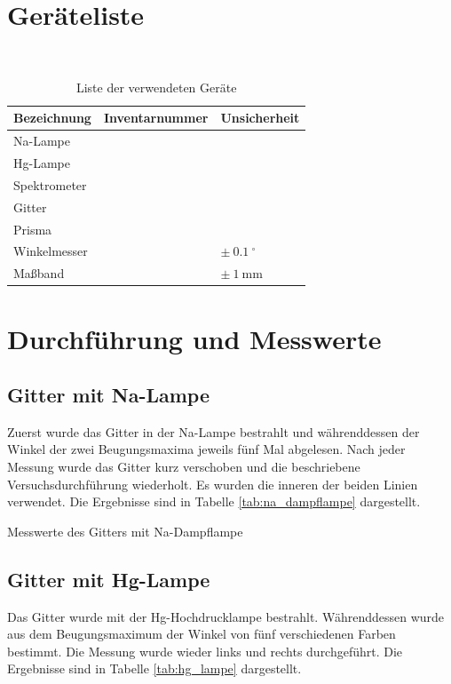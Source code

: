 \documentclass{article}
\begin{document}
\newpage

\section{Geräteliste}

\begin{table}[H]
\caption{Liste der verwendeten Geräte}

~

\begin{tabular}{l|ll}
Bezeichnung & Inventarnummer & Unsicherheit \\
\hline
Na-Lampe & & \\
Hg-Lampe & & \\
Spektrometer & & \\
Gitter & & \\
Prisma & & \\
Winkelmesser & & $\pm~0.1~^\circ$ \\
Maßband & & $\pm~1~$mm
\end{tabular}

\end{table}




\section{Durchführung und Messwerte}


\subsection{Gitter mit Na-Lampe}

Zuerst wurde das Gitter in der Na-Lampe bestrahlt und währenddessen der Winkel der zwei Beugungsmaxima jeweils fünf Mal abgelesen. Nach jeder Messung wurde das Gitter kurz verschoben und die beschriebene Versuchsdurchführung wiederholt. Es wurden die inneren der beiden Linien verwendet. Die Ergebnisse sind in Tabelle \ref{tab:na_dampflampe} dargestellt.

\begin{table}[H]
\caption{Messwerte des Gitters mit Na-Dampflampe}
\label{tab:na_dampflampe}
\centering

\end{table}

\subsection{Gitter mit Hg-Lampe}

Das Gitter wurde mit der Hg-Hochdrucklampe bestrahlt. Währenddessen wurde aus dem Beugungsmaximum der Winkel von fünf verschiedenen Farben bestimmt. Die Messung wurde wieder links und rechts durchgeführt. Die Ergebnisse sind in Tabelle \ref{tab:hg_lampe} dargestellt.
\end{document}
